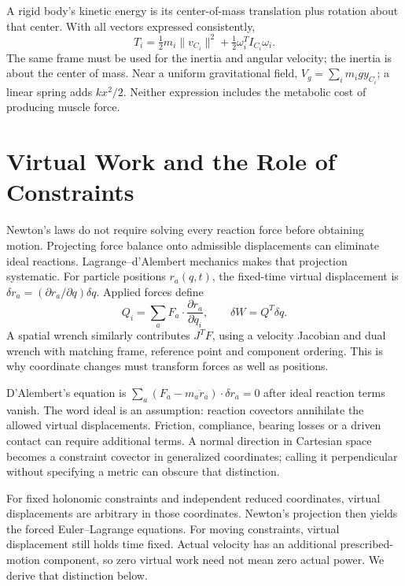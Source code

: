 A rigid body's kinetic energy is its center-of-mass translation plus rotation about that center. With all vectors expressed consistently,
\begin{equation}
T_i=\tfrac12m_i\|v_{C_i}\|^2+
\tfrac12\omega_i^TI_{C_i}\omega_i.
\label{eq:lagrangian_body_energy}
\end{equation}
The same frame must be used for the inertia and angular velocity; the inertia is about the center of mass. Near a uniform gravitational field, $V_g=\sum_i m_i g y_{C_i}$; a linear spring adds $k x^2/2$. Neither expression includes the metabolic cost of producing muscle force.

\section{Virtual Work and the Role of Constraints}
\label{sec:lagrangian_virtual_work}

Newton's laws do not require solving every reaction force before obtaining motion. Projecting force balance onto admissible displacements can eliminate ideal reactions. Lagrange--d'Alembert mechanics makes that projection systematic. For particle positions $r_a(q,t)$, the fixed-time virtual displacement is $\delta r_a=(\partial r_a/\partial q)\delta q$. Applied forces define
\begin{equation}
Q_i=\sum_a F_a\mathbin{\cdot}\frac{\partial r_a}{\partial q_i},
\qquad \delta W=Q^T\delta q.
\label{eq:lagrangian_generalized_force}
\end{equation}
A spatial wrench similarly contributes $J^TF$, using a velocity Jacobian and dual wrench with matching frame, reference point and component ordering. This is why coordinate changes must transform forces as well as positions.

D'Alembert's equation is $\sum_a(F_a-m_a\ddot r_a)\cdot\delta r_a=0$ after ideal reaction terms vanish. The word ideal is an assumption: reaction covectors annihilate the allowed virtual displacements. Friction, compliance, bearing losses or a driven contact can require additional terms. A normal direction in Cartesian space becomes a constraint covector in generalized coordinates; calling it perpendicular without specifying a metric can obscure that distinction.

For fixed holonomic constraints and independent reduced coordinates, virtual displacements are arbitrary in those coordinates. Newton's projection then yields the forced Euler--Lagrange equations. For moving constraints, virtual displacement still holds time fixed. Actual velocity has an additional prescribed-motion component, so zero virtual work need not mean zero actual power. We derive that distinction below.

